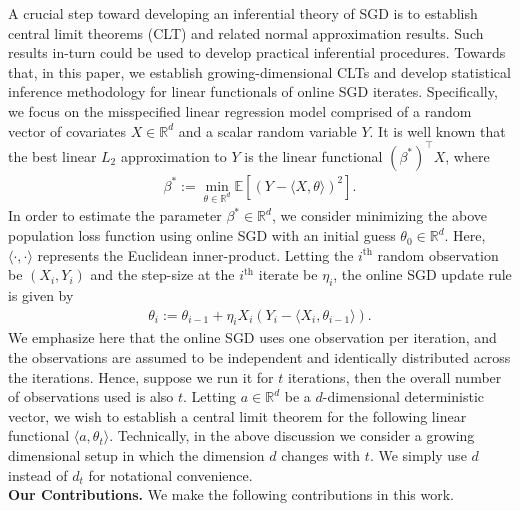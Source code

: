 \documentclass[11pt, reqno,english]{amsart}
\begin{document}
A crucial step toward developing an inferential theory of SGD is to establish central limit theorems (CLT) and related normal approximation results. Such results in-turn could be used to develop practical inferential procedures. Towards that, in this paper, we establish growing-dimensional CLTs and develop statistical inference methodology for linear functionals of online SGD iterates. Specifically, we focus on the misspecified linear regression model comprised of a  random vector of covariates $X \in \mathbb{R}^d$ and a scalar random variable $Y$. It is well known that the best linear $L_2$ approximation to $Y$ is the linear functional $(\beta^*)^\top X$, where
\begin{align*}
\textstyle
\beta^* := \min_{\theta \in \mathbb{R}^d}\mathbb{E}[(Y-\langle X,\theta\rangle)^2].
\end{align*}
In order to estimate the parameter $\beta^* \in \mathbb{R}^d$, we consider minimizing the above population loss function using online SGD with an initial guess $\theta_0 \in \mathbb{R}^d$. Here, $\langle \cdot, \cdot \rangle$ represents the Euclidean inner-product. Letting the $i^{\textrm{th}}$ random observation be $(X_i, Y_i)$ and the step-size at the $i^{\textrm{th}}$ iterate be $\eta_i$, the online SGD update rule is given by
 \begin{align}\label{eq:ithiterate}
 \theta_{i}:= \theta_{i-1}+ \eta_{i} X_{i}(Y_{i}- \langle X_{i}, \theta_{i-1}\rangle).
\end{align}
We emphasize here that the online SGD uses one observation per iteration, and the observations are assumed to be independent and identically distributed across the iterations. Hence, suppose we run it for $t$ iterations, then the overall number of observations used is also $t$. Letting $a \in \mathbb{R}^{d}$ be a $d$-dimensional deterministic vector, we wish to establish a central limit theorem for the following linear functional $\langle a, \theta_t \rangle$. Technically, in the above discussion we consider a growing dimensional setup in which the dimension $d$ changes with $t$. We simply use $d$ instead of $d_t$ for notational convenience. \\



\textbf{Our Contributions.} We make the following contributions in this work.
\end{document}
